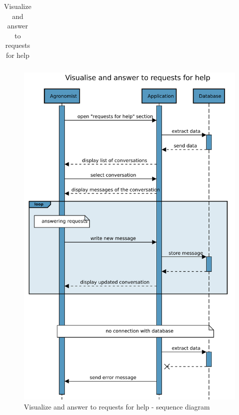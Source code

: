 \begin{table}[H]
\begin{tabular}[c]{|l|p{}|}
    \end{tabular}
    \caption{\label{tab:help_request_section_access}Visualize and answer to requests for help}
\end{table}

\begin{figure}[H]
    \centering
    \includegraphics[scale=0.75]{Images/Sequence diagrams/Agronomist - visualise and answer requests for help.pdf}

    \caption{Visualize and answer to requests for help - sequence diagram}
    \label{fig:fig:seq_diag_answer_request}
\end{figure}


